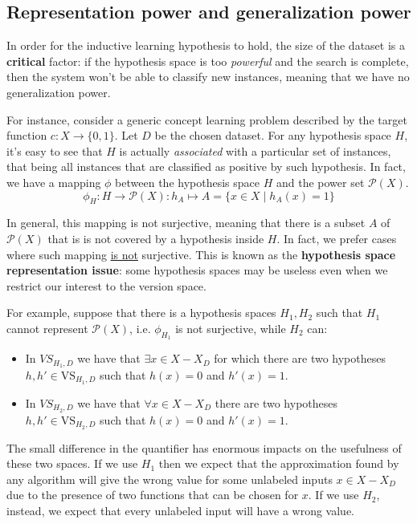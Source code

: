 \documentclass[a4paper, 12pt]{report}
\begin{document}
    \subsection{Representation power and generalization power}
    
    In order for the inductive learning hypothesis to hold, the size of the dataset is a \textbf{critical} factor: if the hypothesis space is too \textit{powerful} and the search is complete, then the system won't be able to classify new instances, meaning that we have no generalization power.

    For instance, consider a generic concept learning problem described by the target function $c : X \to \{0,1\}$. Let $D$ be the chosen dataset. For any hypothesis space $H$, it's easy to see that $H$ is actually \textit{associated} with a particular set of instances, that being all instances that are classified as positive by such hypothesis. In fact, we have a mapping $\phi$ between the hypothesis space $H$ and the power set $\mathcal{P}(X)$.
    \[\phi_H : H \to \mathcal{P}(X) : h_A \mapsto A = \{x \in X \mid h_A(x) = 1\}\]

    In general, this mapping is not surjective, meaning that there is a subset $A$ of $\mathcal{P}(X)$ that is is not covered by a hypothesis inside $H$. In fact, we prefer cases where such mapping \underline{is not} surjective. This is known as the \textbf{hypothesis space representation issue}: some hypothesis spaces may be useless even when we restrict our interest to the version space.
    
    For example, suppose that there is a hypothesis spaces $H_1, H_2$ such that $H_1$ cannot represent $\mathcal{P}(X)$, i.e. $\phi_{H_1}$ is not surjective, while $H_2$ can:
    \begin{itemize}
        \item In $VS_{H_1,D}$ we have that $\exists x \in X-X_D$ for which there are two hypotheses $h, h' \in \mathrm{VS}_{H_1,D}$ such that $h(x) = 0$ and $h'(x) = 1$.
        \item In $VS_{H_2,D}$ we have that $\forall x \in X-X_D$ there are two hypotheses $h, h' \in \mathrm{VS}_{H_2,D}$ such that $h(x) = 0$ and $h'(x) = 1$.
    \end{itemize}
    
    The small difference in the quantifier has enormous impacts on the usefulness of these two spaces. If we use $H_1$ then we expect that the approximation found by any algorithm will give the wrong value for some unlabeled inputs $x \in X -X_D$ due to the presence of two functions that can be chosen for $x$. If we use $H_2$, instead, we expect that every unlabeled input will have a wrong value.
    
\end{document}
